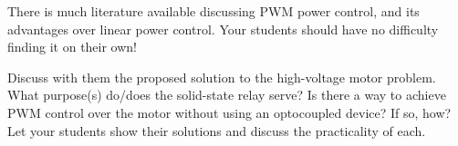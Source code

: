 





There is much literature available discussing PWM power control, and its advantages over linear power control.  Your students should have no difficulty finding it on their own!

Discuss with them the proposed solution to the high-voltage motor problem.  What purpose(s) do/does the solid-state relay serve?  Is there a way to achieve PWM control over the motor without using an optocoupled device?  If so, how?  Let your students show their solutions and discuss the practicality of each.




